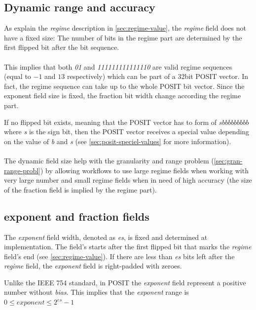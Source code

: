 \documentclass[10pt]{article}
\begin{document}
\subsection{Dynamic range and accuracy}\label{sec:dynam-range-accur}

As explain the \textit{regime} description in \autoref{sec:regime-value}, the \textit{regime}
field does not have a fixed size: The number of bits in the regime part are
determined by the first flipped bit after the bit sequence. \\\\
This implies that both \textit{01} and \textit{111111111111110} are valid regime sequences
(equal to $-1$ and $13$ respectively) which can be part of a 32bit POSIT vector.
In fact, the regime sequence can take up to the whole POSIT bit vector.
Since the exponent field size is fixed, the fraction bit width change according
the regime part.

If no flipped bit exists, meaning that the POSIT vector has to form of
\textit{$sbbbbbbbbb$} where \textit{s} is the sign bit, then the POSIT vector
receives a special value depending on the value of \textit{b} and \textit{s}
(see \autoref{sec:posit-speciel-values} for more information).

\paragraph{}
The dynamic field size help with the granularity and range problem
(\ref{sec:gran-range-probl}) by allowing workflows to use large regime
fields when working with very large number and small regime fields when in need
of high accuracy (the size of the fraction field is implied by the regime part).

\subsection{exponent and fraction fields}\label{sec:expon-fract-fields}

The \textit{exponent} field width, denoted as \textit{es}, is fixed and determined at
implementation. The field's starts after the first flipped bit that marks the
\textit{regime} field's end (see \autoref{sec:regime-value}). If there are less
than \textit{es} bits left after the \textit{regime} field, the
\textit{exponent} field is right-padded with zeroes.

Unlike the IEEE 754 standard, in POSIT the \textit{exponent} field represent a
positive number without \textit{bias}. This implies that the \textit{exponent}
range is $0 \leq exponent \leq 2^{es} - 1$
\end{document}
